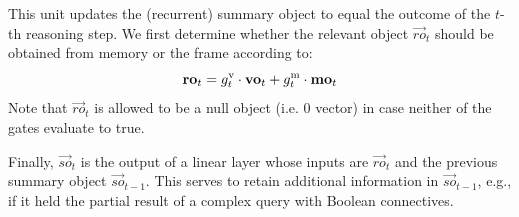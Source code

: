 This unit updates the (recurrent) summary object to equal the outcome of the $t$-th reasoning step.
We first determine whether the relevant object $\vec{ro}_t$ should be obtained from memory or the frame according to:
\[ \mathbf{ro}_t = g^{\mathrm{v}}_t \cdot \mathbf{vo}_t + g^{\mathrm{m}}_t \cdot \mathbf{mo}_t \]
Note that $\vec{ro}_t$ is allowed to be a null object (i.e. 0 vector) in case neither of the gates evaluate to true.

 Finally, $\vec{so}_t$ is the output of a linear layer whose inputs are $\vec{ro}_t$ and the previous summary object $\vec{so}_{t-1}$.
This serves to retain additional information in $\vec{so}_{t-1}$, e.g., if it held the partial result of a complex query with Boolean connectives.


